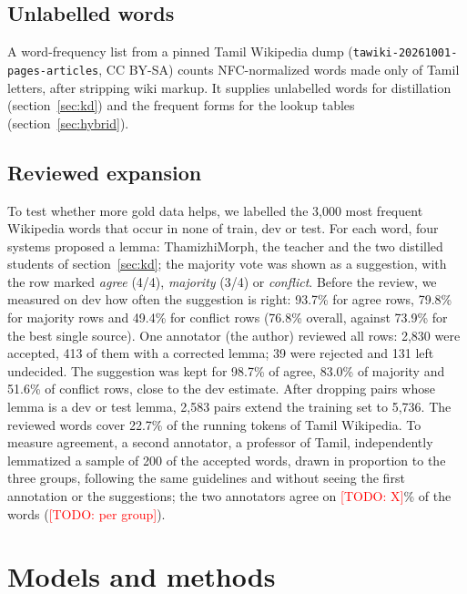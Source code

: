 \documentclass{sadhana}
\newcommand{\todo}[1]{\textcolor{red}{[TODO: #1]}}
\begin{document}
\subsection{Unlabelled words}

A word-frequency list from a pinned Tamil Wikipedia dump
(\texttt{tawiki-20261001-pages-articles}, CC BY-SA) counts NFC-normalized words
made only of Tamil letters, after stripping wiki markup. It supplies unlabelled
words for distillation (section~\ref{sec:kd}) and the frequent forms for the
lookup tables (section~\ref{sec:hybrid}).

\subsection{Reviewed expansion}
\label{sec:expansion}

To test whether more gold data helps, we labelled the 3,000 most frequent
Wikipedia words that occur in none of train, dev or test. For each word, four
systems proposed a lemma: ThamizhiMorph, the teacher and the two distilled
students of section~\ref{sec:kd}; the majority vote was shown as a suggestion,
with the row marked \emph{agree} (4/4), \emph{majority} (3/4) or
\emph{conflict}. Before the review, we measured on dev how often the suggestion
is right: 93.7\% for agree rows, 79.8\% for majority rows and 49.4\% for
conflict rows (76.8\% overall, against 73.9\% for the best single source). One
annotator (the author) reviewed all rows: 2,830 were accepted, 413 of them
with a corrected lemma; 39 were rejected and 131 left undecided. The suggestion
was kept for 98.7\% of agree, 83.0\% of majority and 51.6\% of conflict rows,
close to the dev estimate. After dropping pairs whose lemma is a dev or test
lemma, 2,583 pairs extend the training set to 5,736. The reviewed words cover
22.7\% of the running tokens of Tamil Wikipedia. To measure agreement, a second annotator, a professor of Tamil, independently
lemmatized a sample of 200 of the accepted words, drawn in proportion to the
three groups, following the same guidelines and without seeing the first
annotation or the suggestions; the two annotators agree on \todo{X}\% of the
words (\todo{per group}).

\section{Models and methods}
\label{sec:method}
\end{document}
